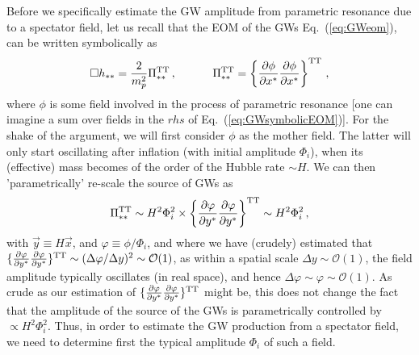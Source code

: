 \documentclass[a4paper,11pt]{article}
\begin{document}
Before we specifically estimate the GW amplitude from parametric resonance due to a spectator field, let us recall that the EOM of the GWs Eq.~(\ref{eq:GWeom}), can be written symbolically as
\begin{eqnarray}\label{eq:GWsymbolicEOM}
\Box h_{**} = {2\over m_p^2}\Pi_{**}^{\rm TT}\,,~\hspace*{1cm} \Pi_{**}^{\rm TT} = \left\lbrace{\partial\phi\over\partial x^*}{\partial\phi\over\partial x^*}\right\rbrace^{\rm TT}\,,
\end{eqnarray}
where $\phi$ is some field involved in the process of parametric resonance [one can imagine a sum over fields in the $rhs$ of Eq.~(\ref{eq:GWsymbolicEOM})]. For the shake of the argument, we will first consider $\phi$ as the mother field. The latter will only start oscillating after inflation (with initial amplitude $\Phi_i$), when its (effective) mass becomes of the order of the Hubble rate $\sim H$. We can then 'parametrically' re-scale the source of GWs as 
\begin{eqnarray}\label{eq:GWsymbolicEOMII}
\Pi_{**}^{\rm TT} \sim H^2\Phi_i^2\times\left\lbrace{\partial\varphi\over\partial y^*}{\partial\varphi\over\partial y^*}\right\rbrace^{\rm TT} \sim H^2\Phi_i^2\,,
\end{eqnarray}
with $\vec y \equiv H\vec x$, and $\varphi \equiv \phi/\Phi_i$, and where we have (crudely) estimated that $\lbrace{\partial\varphi\over\partial y^*}{\partial\varphi\over\partial y^*}\rbrace^{\rm TT} \sim (\Delta \varphi/\Delta y)^2 \sim \mathcal{O}(1)$, as within a spatial scale $\Delta y \sim \mathcal{O}(1)$, the field amplitude typically oscillates (in real space), and hence $\Delta\varphi \sim \varphi \sim \mathcal{O}(1)$. As crude as our estimation of $\lbrace{\partial\varphi\over\partial y^*}{\partial\varphi\over\partial y^*}\rbrace^{\rm TT}$ might be, this does not change the fact that the amplitude of the source of the GWs is parametrically controlled by $\propto H^2\Phi_i^2$. Thus, in order to estimate the GW production from a spectator field, we need to determine first the typical amplitude $\Phi_i$ of such a field.
\end{document}
